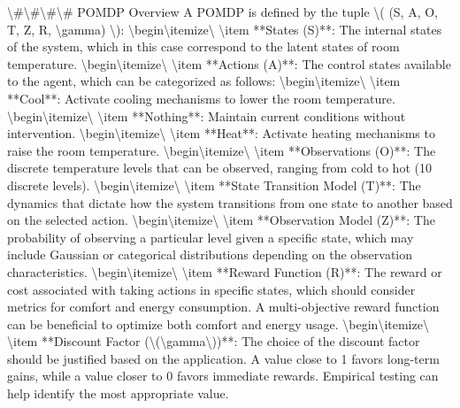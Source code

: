 \documentclass[11pt,a4paper]{article}
\begin{document}
\textbackslash{}#\textbackslash{}#\textbackslash{}#\textbackslash{}# POMDP Overview
A POMDP is defined by the tuple \textbackslash{}( (S, A, O, T, Z, R, \textbackslash{}gamma) \textbackslash{}):
\textbackslash{}begin\textbackslash{}{itemize\textbackslash{}}
\textbackslash{}item **States (S)**: The internal states of the system, which in this case correspond to the latent states of room temperature.
\textbackslash{}begin\textbackslash{}{itemize\textbackslash{}}
\textbackslash{}item **Actions (A)**: The control states available to the agent, which can be categorized as follows:
\textbackslash{}begin\textbackslash{}{itemize\textbackslash{}}
\textbackslash{}item **Cool**: Activate cooling mechanisms to lower the room temperature.
\textbackslash{}begin\textbackslash{}{itemize\textbackslash{}}
\textbackslash{}item **Nothing**: Maintain current conditions without intervention.
\textbackslash{}begin\textbackslash{}{itemize\textbackslash{}}
\textbackslash{}item **Heat**: Activate heating mechanisms to raise the room temperature.
\textbackslash{}begin\textbackslash{}{itemize\textbackslash{}}
\textbackslash{}item **Observations (O)**: The discrete temperature levels that can be observed, ranging from cold to hot (10 discrete levels).
\textbackslash{}begin\textbackslash{}{itemize\textbackslash{}}
\textbackslash{}item **State Transition Model (T)**: The dynamics that dictate how the system transitions from one state to another based on the selected action.
\textbackslash{}begin\textbackslash{}{itemize\textbackslash{}}
\textbackslash{}item **Observation Model (Z)**: The probability of observing a particular level given a specific state, which may include Gaussian or categorical distributions depending on the observation characteristics.
\textbackslash{}begin\textbackslash{}{itemize\textbackslash{}}
\textbackslash{}item **Reward Function (R)**: The reward or cost associated with taking actions in specific states, which should consider metrics for comfort and energy consumption. A multi-objective reward function can be beneficial to optimize both comfort and energy usage.
\textbackslash{}begin\textbackslash{}{itemize\textbackslash{}}
\textbackslash{}item **Discount Factor (\textbackslash{}(\textbackslash{}gamma\textbackslash{}))**: The choice of the discount factor should be justified based on the application. A value close to 1 favors long-term gains, while a value closer to 0 favors immediate rewards. Empirical testing can help identify the most appropriate value.
\end{document}
